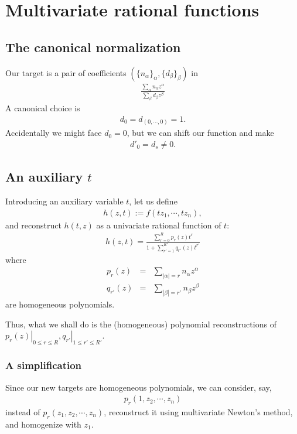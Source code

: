 \documentclass[11pt]{book}
\begin{document}

\section{Multivariate rational functions}
\subsection{The canonical normalization}
Our target is a pair of coefficients $(\{ n_\alpha\}_\alpha, \{ d_\beta\}_\beta)$ in
\begin{eqnarray}
\frac{\sum_\alpha n_\alpha z^\alpha}{\sum_\beta d_\beta z^\beta}
\end{eqnarray}
A canonical choice is
\begin{eqnarray}
d_0 = d_{(0,\cdots,0)} = 1.
\end{eqnarray}
Accidentally we might face $d_0 = 0$, but we can shift our function and make
\begin{eqnarray}
d'_0 = d_{s} \neq 0.
\end{eqnarray}

\subsection{An auxiliary $t$}
Introducing an auxiliary variable $t$, let us define
\begin{eqnarray}
h(z,t) := f(tz_1, \cdots, tz_n),
\end{eqnarray}
and reconstruct $h(t,z)$ as a univariate rational function of $t$:
\begin{eqnarray}
h(z, t) = \frac{\sum_{r=0}^R p_r(z) t^r}{1+ \sum_{r'=1}^{R'} q_{r'}(z) t^{r'}}
\end{eqnarray}
where
\begin{eqnarray}
p_r(z) &=& \sum_{|\alpha| = r} n_\alpha z^\alpha \\
q_{r'}(z) &=& \sum_{|\beta| = r'} n_\beta z^\beta
\end{eqnarray}
are homogeneous polynomials.

Thus, what we shall do is the (homogeneous) polynomial reconstructions of $\left. p_r(z) \right|_{0 \leq r \leq R}, \left. q_{r'} \right|_{1 \leq r' \leq R'}$.

\subsubsection{A simplification}
Since our new targets are homogeneous polynomials, we can consider, say,
\begin{eqnarray}
p_r(1, z_2, \cdots, z_n)
\end{eqnarray}
instead of $p_r(z_1, z_2, \cdots, z_n)$, reconstruct it using multivariate Newton's method, and homogenize with $z_1$.
\end{document}
